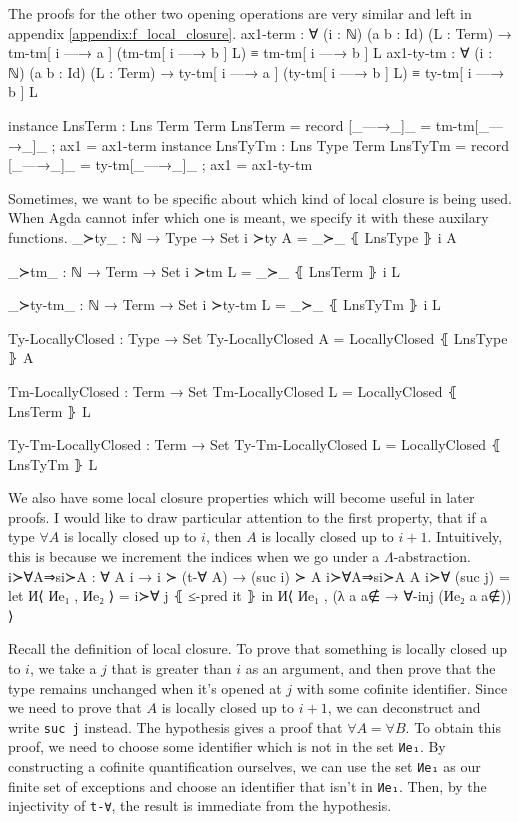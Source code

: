 \documentclass[logo,bsc,singlespacing,parskip,online]{infthesis}
\renewenvironment{code}{\mintedcopy[breaklines,breaksymbolleft=\;]{agda}}{\endmintedcopy}
\begin{document}
The proofs for the other two opening operations are very similar and left in appendix \ref{appendix:f_local_closure}.
\begin{code}
  ax1-term : ∀ (i : ℕ) (a b : Id) (L : Term)
    → tm-tm[ i —→ a ] (tm-tm[ i —→ b ] L) ≡ tm-tm[ i —→ b ] L
  ax1-ty-tm : ∀ (i : ℕ) (a b : Id) (L : Term)
    → ty-tm[ i —→ a ] (ty-tm[ i —→ b ] L) ≡ ty-tm[ i —→ b ] L

  instance
    LnsTerm : Lns Term Term
    LnsTerm = record
      { [_—→_]_ = tm-tm[_—→_]_
      ; ax1 = ax1-term }
  instance
    LnsTyTm : Lns Type Term
    LnsTyTm = record
      { [_—→_]_ = ty-tm[_—→_]_
      ; ax1 = ax1-ty-tm }
\end{code}

Sometimes, we want to be specific about which kind of local closure is being used. When Agda cannot
infer which one is meant, we specify it with these auxilary functions.
\begin{code}
  _≻ty_ : ℕ → Type → Set
  i ≻ty A = _≻_ ⦃ LnsType ⦄ i A

  _≻tm_ : ℕ → Term → Set
  i ≻tm L = _≻_ ⦃ LnsTerm ⦄ i L

  _≻ty-tm_ : ℕ → Term → Set
  i ≻ty-tm L = _≻_ ⦃ LnsTyTm ⦄ i L

  Ty-LocallyClosed : Type → Set
  Ty-LocallyClosed A = LocallyClosed ⦃ LnsType ⦄ A

  Tm-LocallyClosed : Term → Set
  Tm-LocallyClosed L = LocallyClosed ⦃ LnsTerm ⦄ L

  Ty-Tm-LocallyClosed : Term → Set
  Ty-Tm-LocallyClosed L = LocallyClosed ⦃ LnsTyTm ⦄ L
\end{code}

We also have some local closure properties which will become useful in later proofs. I would like to
draw particular attention to the first property, that if a type $\forall A$ is locally closed up to
$i$, then $A$ is locally closed up to $i + 1$. Intuitively, this is because we increment the indices
when we go under a $\Lambda$-abstraction.
\begin{code}
  i≻∀A⇒si≻A : ∀ {A i} → i ≻ (t-∀ A) → (suc i) ≻ A
  i≻∀A⇒si≻A {A} i≻∀ (suc j) =
    let И⟨ Иe₁ , Иe₂ ⟩ = i≻∀ j ⦃ ≤-pred it ⦄
    in И⟨ Иe₁ , (λ a {a∉} → ∀-inj (Иe₂ a {a∉})) ⟩
\end{code}

Recall the definition of local closure. To prove that something is locally closed up to $i$, we take
a $j$ that is greater than $i$ as an argument, and then prove that the type remains unchanged when
it's opened at $j$ with some cofinite identifier. Since we need to prove that $A$ is locally closed
up to $i + 1$, we can deconstruct and write \texttt{suc j} instead. The hypothesis gives a proof
that $\forall A = \forall B$. To obtain this proof, we need to choose some identifier which is not
in the set \texttt{Иe₁}. By constructing a cofinite quantification ourselves, we can use the set
\texttt{Иe₁} as our finite set of exceptions and choose an identifier that isn't in \texttt{Иe₁}.
Then, by the injectivity of \texttt{t-∀}, the result is immediate from the hypothesis.
\end{document}
